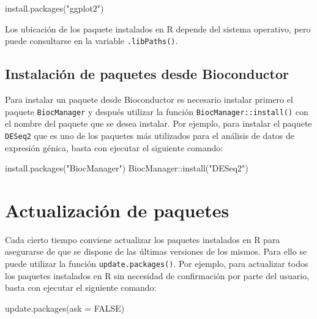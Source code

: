 \documentclass[
  spanish,
  a4paper,
]{scrreport}
\newenvironment{Shaded}{\begin{snugshade}}{\end{snugshade}}
\newcommand{\AttributeTok}[1]{\textcolor[rgb]{0.40,0.45,0.13}{#1}}
\newcommand{\ConstantTok}[1]{\textcolor[rgb]{0.56,0.35,0.01}{#1}}
\newcommand{\FunctionTok}[1]{\textcolor[rgb]{0.28,0.35,0.67}{#1}}
\newcommand{\NormalTok}[1]{\textcolor[rgb]{0.00,0.23,0.31}{#1}}
\newcommand{\SpecialCharTok}[1]{\textcolor[rgb]{0.37,0.37,0.37}{#1}}
\newcommand{\StringTok}[1]{\textcolor[rgb]{0.13,0.47,0.30}{#1}}
\theoremstyle{definition}
\theoremstyle{remark}
\begin{document}
\begin{Shaded}
\begin{Highlighting}[]
\FunctionTok{install.packages}\NormalTok{(}\StringTok{"ggplot2"}\NormalTok{)}
\end{Highlighting}
\end{Shaded}

Los ubicación de los paquete instalados en R depende del sistema
operativo, pero puede consultarse en la variable \texttt{.libPaths()}.

\subsection{Instalación de paquetes desde
Bioconductor}\label{instalaciuxf3n-de-paquetes-desde-bioconductor}

Para instalar un paquete desde Bioconductor es necesario instalar
primero el paquete \texttt{BiocManager} y después utilizar la función
\texttt{BiocManager::install()} con el nombre del paquete que se desea
instalar. Por ejemplo, para instalar el paquete \texttt{DESeq2} que es
uno de los paquetes más utilizados para el análisis de datos de
expresión génica, basta con ejecutar el siguiente comando:

\begin{Shaded}
\begin{Highlighting}[]
\FunctionTok{install.packages}\NormalTok{(}\StringTok{"BiocManager"}\NormalTok{)}
\NormalTok{BiocManager}\SpecialCharTok{::}\FunctionTok{install}\NormalTok{(}\StringTok{"DESeq2"}\NormalTok{)}
\end{Highlighting}
\end{Shaded}

\section{Actualización de paquetes}\label{actualizaciuxf3n-de-paquetes}

Cada cierto tiempo conviene actualizar los paquetes instalados en R para
asegurarse de que se dispone de las últimas versiones de los mismos.
Para ello se puede utilizar la función \texttt{update.packages()}. Por
ejemplo, para actualizar todos los paquetes instalados en R sin
necesidad de confirmación por parte del usuario, basta con ejecutar el
siguiente comando:

\begin{Shaded}
\begin{Highlighting}[]
\FunctionTok{update.packages}\NormalTok{(}\AttributeTok{ask =} \ConstantTok{FALSE}\NormalTok{)}
\end{Highlighting}
\end{Shaded}
\end{document}
